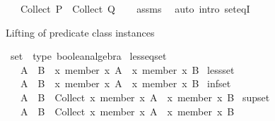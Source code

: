 \begin{isabellebody}
\ \ \ {\isachardoublequoteopen}Collect\ P\ {\isacharequal}{\kern0pt}\ Collect\ Q{\isachardoublequoteclose}\isanewline
%
\isadelimproof
\ \ %
\endisadelimproof
%
\isatagproof
{}\isamarkupfalse%
\ assms\ \isamarkupfalse%
\ {\isacharparenleft}{\kern0pt}auto\ intro{\isacharcolon}{\kern0pt}\ set{\isacharunderscore}{\kern0pt}eqI{\isacharparenright}{\kern0pt}%
\endisatagproof
{\isafoldproof}%
%
\isadelimproof
%
\endisadelimproof
%
\begin{isamarkuptext}%
Lifting of predicate class instances%
\end{isamarkuptext}\isamarkuptrue%
\isamarkupfalse%
\ set\ {\isacharcolon}{\kern0pt}{\isacharcolon}{\kern0pt}\ {\isacharparenleft}{\kern0pt}type{\isacharparenright}{\kern0pt}\ boolean{\isacharunderscore}{\kern0pt}algebra\isanewline
{}\isanewline
\isanewline
{}\isamarkupfalse%
\ less{\isacharunderscore}{\kern0pt}eq{\isacharunderscore}{\kern0pt}set\isanewline
\ \ \ {\isachardoublequoteopen}A\ {\isasymle}\ B\ {\isasymlongleftrightarrow}\ {\isacharparenleft}{\kern0pt}{\isasymlambda}x{\isachardot}{\kern0pt}\ member\ x\ A{\isacharparenright}{\kern0pt}\ {\isasymle}\ {\isacharparenleft}{\kern0pt}{\isasymlambda}x{\isachardot}{\kern0pt}\ member\ x\ B{\isacharparenright}{\kern0pt}{\isachardoublequoteclose}\isanewline
\isanewline
{}\isamarkupfalse%
\ less{\isacharunderscore}{\kern0pt}set\isanewline
\ \ \ {\isachardoublequoteopen}A\ {\isacharless}{\kern0pt}\ B\ {\isasymlongleftrightarrow}\ {\isacharparenleft}{\kern0pt}{\isasymlambda}x{\isachardot}{\kern0pt}\ member\ x\ A{\isacharparenright}{\kern0pt}\ {\isacharless}{\kern0pt}\ {\isacharparenleft}{\kern0pt}{\isasymlambda}x{\isachardot}{\kern0pt}\ member\ x\ B{\isacharparenright}{\kern0pt}{\isachardoublequoteclose}\isanewline
\isanewline
{}\isamarkupfalse%
\ inf{\isacharunderscore}{\kern0pt}set\isanewline
\ \ \ {\isachardoublequoteopen}A\ {\isasymsqinter}\ B\ {\isacharequal}{\kern0pt}\ Collect\ {\isacharparenleft}{\kern0pt}{\isacharparenleft}{\kern0pt}{\isasymlambda}x{\isachardot}{\kern0pt}\ member\ x\ A{\isacharparenright}{\kern0pt}\ {\isasymsqinter}\ {\isacharparenleft}{\kern0pt}{\isasymlambda}x{\isachardot}{\kern0pt}\ member\ x\ B{\isacharparenright}{\kern0pt}{\isacharparenright}{\kern0pt}{\isachardoublequoteclose}\isanewline
\isanewline
{}\isamarkupfalse%
\ sup{\isacharunderscore}{\kern0pt}set\isanewline
\ \ \ {\isachardoublequoteopen}A\ {\isasymsqunion}\ B\ {\isacharequal}{\kern0pt}\ Collect\ {\isacharparenleft}{\kern0pt}{\isacharparenleft}{\kern0pt}{\isasymlambda}x{\isachardot}{\kern0pt}\ member\ x\ A{\isacharparenright}{\kern0pt}\ {\isasymsqunion}\ {\isacharparenleft}{\kern0pt}{\isasymlambda}x{\isachardot}{\kern0pt}\ member\ x\ B{\isacharparenright}{\kern0pt}{\isacharparenright}{\kern0pt}{\isachardoublequoteclose}\isanewline

\end{isabellebody}
